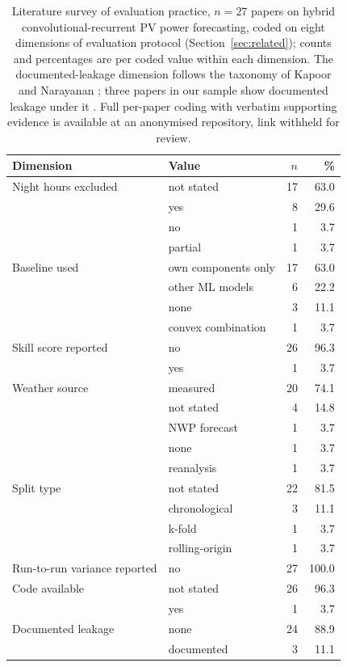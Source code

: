 \begin{table}[t]
  \centering
  \footnotesize
  \caption{Literature survey of evaluation practice, $n=27$ papers on
  hybrid convolutional-recurrent PV power forecasting, coded on eight
  dimensions of evaluation protocol (Section~\ref{sec:related}); counts and
  percentages are per coded value within each dimension. The
  documented-leakage dimension follows the taxonomy of Kapoor and
  Narayanan \cite{kapoor2023leakage}; three papers in our sample show
  documented leakage under it
  \cite{zhou2024cnnlstmattnbayes, li2022eemdssalstm, bhutta2024hcrnhcln}.
  Full per-paper coding with verbatim supporting evidence is available
  at an anonymised repository, link withheld for review.}
  \label{tab:T1}
  \begin{tabular}{llrr}
    \toprule
    Dimension & Value & $n$ & \% \\
    \midrule
    Night hours excluded & not stated & 17 & 63.0 \\
     & yes & 8 & 29.6 \\
     & no & 1 & 3.7 \\
     & partial & 1 & 3.7 \\
    \addlinespace
    Baseline used & own components only & 17 & 63.0 \\
     & other ML models & 6 & 22.2 \\
     & none & 3 & 11.1 \\
     & convex combination & 1 & 3.7 \\
    \addlinespace
    Skill score reported & no & 26 & 96.3 \\
     & yes & 1 & 3.7 \\
    \addlinespace
    Weather source & measured & 20 & 74.1 \\
     & not stated & 4 & 14.8 \\
     & NWP forecast & 1 & 3.7 \\
     & none & 1 & 3.7 \\
     & reanalysis & 1 & 3.7 \\
    \addlinespace
    Split type & not stated & 22 & 81.5 \\
     & chronological & 3 & 11.1 \\
     & k-fold & 1 & 3.7 \\
     & rolling-origin & 1 & 3.7 \\
    \addlinespace
    Run-to-run variance reported & no & 27 & 100.0 \\
    \addlinespace
    Code available & not stated & 26 & 96.3 \\
     & yes & 1 & 3.7 \\
    \addlinespace
    Documented leakage & none & 24 & 88.9 \\
     & documented & 3 & 11.1 \\
    \bottomrule
  \end{tabular}
\end{table}
